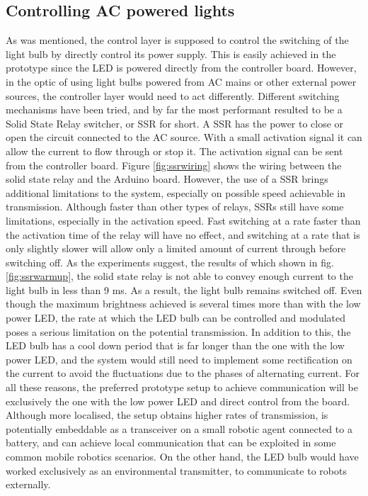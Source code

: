 \subsection{Controlling AC powered lights}
As was mentioned, the control layer is supposed to control the switching of the light bulb by directly control its power supply.
This is easily achieved in the prototype since the LED is powered directly from the controller board.
However, in the optic of using light bulbs powered from AC mains or other external power sources, the controller layer would need to act differently.
Different switching mechanisms have been tried, and by far the most performant resulted to be a Solid State Relay switcher, or SSR for short.
A SSR has the power to close or open the circuit connected to the AC source. With a small activation signal it can allow the current to flow through or stop it.
The activation signal can be sent from the controller board.
Figure \ref{fig:ssrwiring} shows the wiring between the solid state relay and the Arduino board.
However, the use of a SSR brings additional limitations to the system, especially on possible speed achievable in transmission.
Although faster than other types of relays, SSRs still have some limitations, especially in the activation speed. 
Fast switching at a rate faster than the activation time of the relay will have no effect, and switching at a rate that is only slightly slower will allow only a limited amount of current through before switching off.
As the experiments suggest, the results of which shown in fig. \ref{fig:ssrwarmup}, the solid state relay is not able to convey enough current to the light bulb in less than 9 ms.
As a result, the light bulb remains switched off.
Even though the maximum brightness achieved is several times more than with the low power LED, the rate at which the LED bulb can be controlled and modulated poses a serious limitation on the potential transmission.
In addition to this, the LED bulb has a cool down period that is far longer than the one with the low power LED, and the system would still need to implement some rectification on the current to avoid the fluctuations due to the phases of alternating current.
For all these reasons, the preferred prototype setup to achieve communication will be exclusively the one with the low power LED and direct control from the board.
Although more localised, the setup obtains higher rates of transmission, is potentially embeddable as a transceiver on a small robotic agent connected to a battery, and can achieve local communication that can be exploited in some common mobile robotics scenarios.
On the other hand, the LED bulb would have worked exclusively as an environmental transmitter, to communicate to robots externally.


